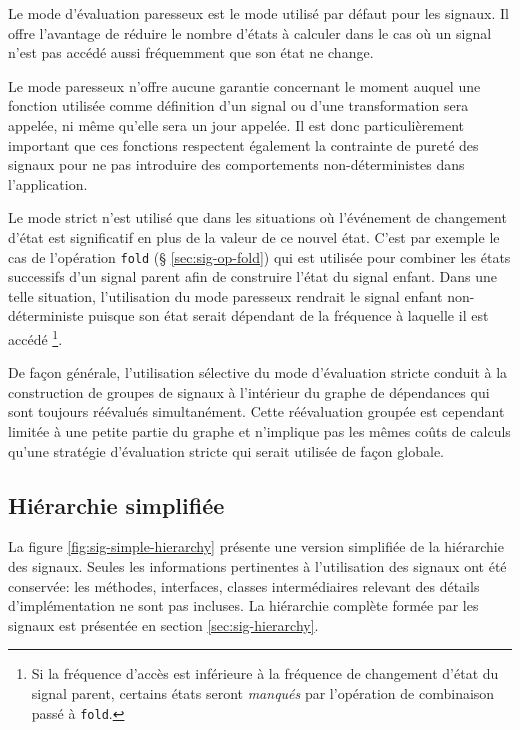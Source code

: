 Le mode d'évaluation paresseux est le mode utilisé par défaut pour les signaux. Il offre l'avantage de réduire le nombre d'états à calculer dans le cas où un signal n'est pas accédé aussi fréquemment que son état ne change.

Le mode paresseux n'offre aucune garantie concernant le moment auquel une fonction utilisée comme définition d'un signal ou d'une transformation sera appelée, ni même qu'elle sera un jour appelée. Il est donc particulièrement important que ces fonctions respectent également la contrainte de pureté des signaux pour ne pas introduire des comportements non-déterministes dans l'application.

Le mode strict n'est utilisé que dans les situations où l'événement de changement d'état est significatif en plus de la valeur de ce nouvel état. C'est par exemple le cas de l'opération \texttt{fold} (§ \ref{sec:sig-op-fold}) qui est utilisée pour combiner les états successifs d'un signal parent afin de construire l'état du signal enfant. Dans une telle situation, l'utilisation du mode paresseux rendrait le signal enfant non-déterministe puisque son état serait dépendant de la fréquence à laquelle il est accédé \footnote{Si la fréquence d'accès est inférieure à la fréquence de changement d'état du signal parent, certains états seront \emph{manqués} par l'opération de combinaison passé à \texttt{fold}.}.

De façon générale, l'utilisation sélective du mode d'évaluation stricte conduit à la construction de groupes de signaux à l'intérieur du graphe de dépendances qui sont toujours réévalués simultanément. Cette réévaluation groupée est cependant limitée à une petite partie du graphe et n'implique pas les mêmes coûts de calculs qu'une stratégie d'évaluation stricte qui serait utilisée de façon globale. 

\subsection{Hiérarchie simplifiée}
La figure \ref{fig:sig-simple-hierarchy} présente une version simplifiée de la hiérarchie des signaux. Seules les informations pertinentes à l'utilisation des signaux ont été conservée: les méthodes, interfaces, classes intermédiaires relevant des détails d'implémentation ne sont pas incluses. La hiérarchie complète formée par les signaux est présentée en section \ref{sec:sig-hierarchy}.

